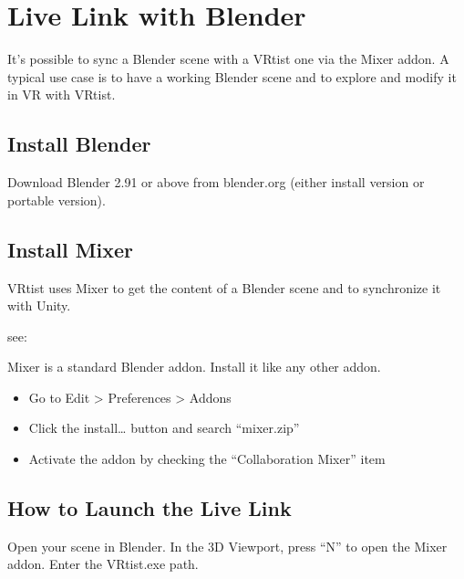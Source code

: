 \documentclass[letterpaper,10pt,english,openany,oneside]{sphinxmanual}
\begin{document}
\section{Live Link with Blender}
\label{\detokenize{Start/Link:live-link-with-blender}}\label{\detokenize{Start/Link::doc}}
\sphinxAtStartPar
It’s possible to sync a Blender scene with a VRtist one via the Mixer add\sphinxhyphen{}on. A typical use case is to have a working Blender scene and to explore and modify it in VR with VRtist.


\subsection{Install Blender}
\label{\detokenize{Start/Link:install-blender}}
\sphinxAtStartPar
Download Blender 2.91 or above from blender.org (either install version or portable version).


\subsection{Install Mixer}
\label{\detokenize{Start/Link:install-mixer}}
\sphinxAtStartPar
VRtist uses Mixer to get the content of a Blender scene and to synchronize it with Unity.

\sphinxAtStartPar
see: 

\sphinxAtStartPar
Mixer is a standard Blender addon. Install it like any other addon.
\begin{itemize}
\item {} 
\sphinxAtStartPar
Go to Edit \textgreater{} Preferences \textgreater{} Add\sphinxhyphen{}ons

\item {} 
\sphinxAtStartPar
Click the install… button and search “mixer.zip”

\item {} 
\sphinxAtStartPar
Activate the add\sphinxhyphen{}on by checking the “Collaboration Mixer” item

\end{itemize}


\subsection{How to Launch the Live Link}
\label{\detokenize{Start/Link:how-to-launch-the-live-link}}
\sphinxAtStartPar
Open your scene in Blender. In the 3D Viewport, press “N” to open the Mixer addon. Enter the VRtist.exe path.
\end{document}
